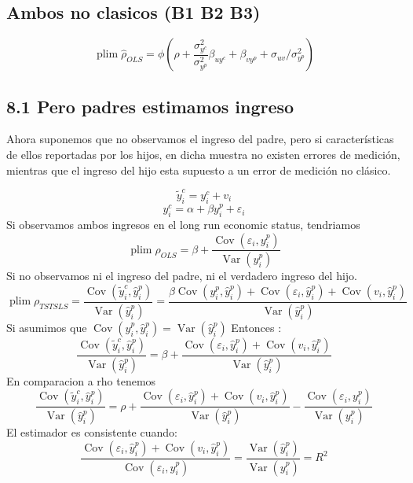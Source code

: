\documentclass[12pt,oneside]{article}
\DeclareMathOperator*{\plim}{plim}
\theoremstyle{bracket}
\begin{document}
\subsection{Ambos no clasicos (B1 B2 B3)}
$$\plim \hat{\rho}_{OLS} = \phi(\rho + \frac{\sigma^2_{y^c}}{\sigma^2_{y^p}}\beta_{uy^c} + \beta_{vy^p} + \sigma_{uv}/\sigma^2_{y^p}) $$

\subsection{8.1 Pero padres estimamos ingreso}

Ahora suponemos que no observamos el ingreso del padre, pero si características de ellos reportadas por los hijos, en dicha muestra no existen errores de medición, mientras que  el ingreso del hijo esta supuesto a un error de medición no clásico.

$$\tilde{y}^c_i = y_i^c + v_i$$
$$y_i^c = \alpha + \beta y_i^p + \varepsilon_i$$
Si observamos ambos ingresos en el long run economic status, tendriamos
$$\plim \rho_{OLS} = \beta + \frac{\operatorname{Cov}(\varepsilon_i,y_i^p)}{\operatorname{Var}(y_i^p)}$$
Si no observamos ni el ingreso del padre, ni el verdadero ingreso del hijo.
$$\plim \rho_{TSTSLS} = \frac{\operatorname{Cov}(\tilde{y}_i^c,\hat{y}_i^p)}{\operatorname{Var}(\hat{y}_i^p)}= \frac{\beta \operatorname{Cov}(y_i^p,\hat{y}_i^p)+\operatorname{Cov}(\varepsilon_i,\hat{y}_i^p)+\operatorname{Cov}(v_i,\hat{y}_i^p)}{\operatorname{Var}(\hat{y}_i^p)}$$
Si asumimos que $\operatorname{Cov}(y_i^p,\hat{y}_i^p) = \operatorname{Var}(\hat{y}_i^p)$ Entonces : 
$$ \frac{\operatorname{Cov}(\tilde{y}_i^c,\hat{y}_i^p)}{\operatorname{Var}(\hat{y}_i^p)}= \beta + \frac{\operatorname{Cov}(\varepsilon_i,\hat{y}_i^p)+\operatorname{Cov}(v_i,\hat{y}_i^p)}{\operatorname{Var}(\hat{y}_i^p)}$$
En comparacion a rho tenemos 
$$ \frac{\operatorname{Cov}(\tilde{y}_i^c,\hat{y}_i^p)}{\operatorname{Var}(\hat{y}_i^p)}= \rho + \frac{\operatorname{Cov}(\varepsilon_i,\hat{y}_i^p)+\operatorname{Cov}(v_i,\hat{y}_i^p)}{\operatorname{Var}(\hat{y}_i^p)}-  \frac{\operatorname{Cov}(\varepsilon_i,y_i^p)}{\operatorname{Var}(y_i^p)}$$
El estimador es consistente cuando: 
$$\frac{\operatorname{Cov}(\varepsilon_i,\hat{y}_i^p)+\operatorname{Cov}(v_i,\hat{y}_i^p)}{\operatorname{Cov}(\varepsilon_i,y_i^p)} = \frac{\operatorname{Var}(\hat{y}_i^p)}{\operatorname{Var}(y_i^p)} = R^2$$
\end{document}
